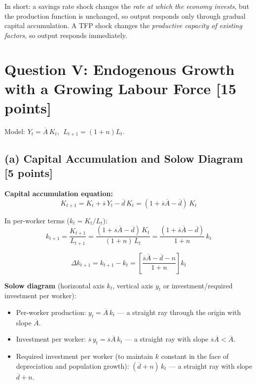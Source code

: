 \documentclass[letterpaper,12pt]{article}
\begin{document}
In short: a savings rate shock changes the \emph{rate at which the economy invests}, but the production function is unchanged, so output responds only through gradual capital accumulation. A TFP shock changes the \emph{productive capacity of existing factors}, so output responds immediately.


\section*{Question V: Endogenous Growth with a Growing Labour Force [15 points]}

\noindent Model: $Y_t = \overline{A}\,K_t$, $\; L_{t+1} = (1+n)L_t$.

\subsection*{(a) Capital Accumulation and Solow Diagram [5 points]}

\noindent\textbf{Capital accumulation equation:}
\[
K_{t+1} = K_t + \overline{s}\,Y_t - \overline{d}\,K_t = (1 + \overline{s}\overline{A} - \overline{d})\,K_t
\]

In per-worker terms ($k_t = K_t/L_t$):
\[
k_{t+1} = \frac{K_{t+1}}{L_{t+1}} = \frac{(1 + \overline{s}\overline{A} - \overline{d})\,K_t}{(1+n)\,L_t} = \frac{(1 + \overline{s}\overline{A} - \overline{d})}{1+n}\,k_t
\]

\textcolor{sol}{
\[
\Delta k_{t+1} = k_{t+1} - k_t = \left[\frac{\overline{s}\overline{A} - \overline{d} - n}{1+n}\right]k_t
\]
}

\noindent\textbf{Solow diagram} (horizontal axis $k_t$, vertical axis $y_t$ or investment/required investment per worker):

\begin{itemize}
  \item Per-worker production: $y_t = \overline{A}\,k_t$ — a straight ray through the origin with slope $\overline{A}$.
  \item Investment per worker: $\overline{s}\,y_t = \overline{s}\overline{A}\,k_t$ — a straight ray with slope $\overline{s}\overline{A} < \overline{A}$.
  \item Required investment per worker (to maintain $k$ constant in the face of depreciation and population growth): $(\overline{d}+n)\,k_t$ — a straight ray with slope $\overline{d}+n$.
\end{itemize}
\end{document}
